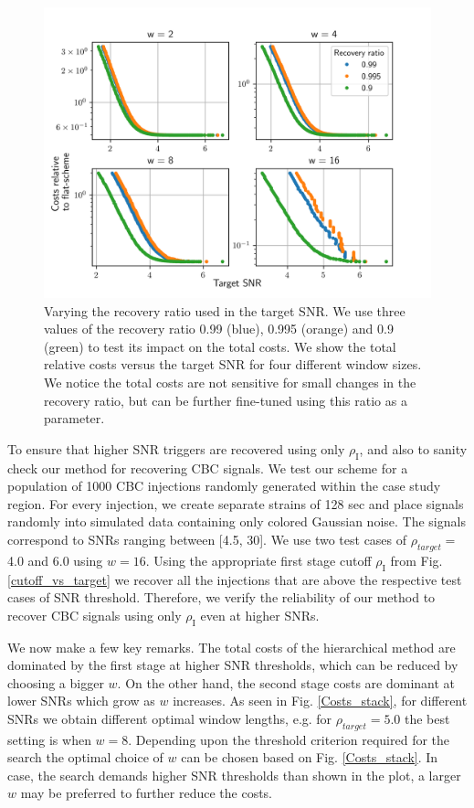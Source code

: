\begin{figure}[H]
    \centering
    \includegraphics[width=\linewidth]{figures/Hierarchical_MF/Tau_tol_costs_comparison.pdf}
    \caption{Varying the recovery ratio used in the target SNR. We use three values of the recovery ratio 0.99 (blue), 0.995 (orange) and 0.9 (green) to test its impact on the total costs. We show the total relative costs versus the target SNR for four different window sizes. We notice the total costs are not sensitive for small changes in the recovery ratio, but can be further fine-tuned using this ratio as a parameter.}
    \label{Fig:recovery_ratio}
\end{figure}

To ensure that higher SNR triggers are recovered using only $\rho_{\text{I}}$, and also to sanity check our method for recovering CBC signals. We test our scheme for a population of 1000 CBC injections randomly generated within the case study region. For every injection, we create separate strains of 128 sec and place signals randomly into simulated data containing only colored Gaussian noise. The signals correspond to SNRs ranging between [4.5, 30]. We use two test cases of $\rho_{target} =$ 4.0 and 6.0 using $w=16$. Using the appropriate first stage cutoff $\rho_{\text{I}}$ from Fig. \ref{cutoff_vs_target} we recover all the injections that are above the respective test cases of SNR threshold. Therefore, we verify the reliability of our method to recover CBC signals using only $\rho_{\text{I}}$ even at higher SNRs.

We now make a few key remarks. The total costs of the hierarchical method are dominated by the first stage at higher SNR thresholds, which can be reduced by choosing a bigger $w$. On the other hand, the second stage costs are dominant at lower SNRs which grow as $w$ increases. As seen in Fig. \ref{Costs_stack}, for different SNRs we obtain different optimal window lengths, e.g. for $\rho_{target} = 5.0$ the best setting is when $w=8$. Depending upon the threshold criterion required for the search the optimal choice of $w$ can be chosen based on Fig. \ref{Costs_stack}. In case, the search demands higher SNR thresholds than shown in the plot, a larger $w$ may be preferred to further reduce the costs.



